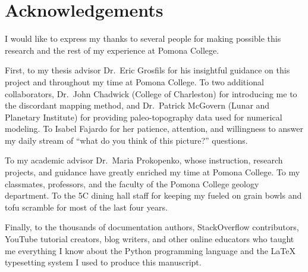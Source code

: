 \chapter*{Acknowledgements}

I would like to express my thanks to several people for making possible this research and the rest of my experience at Pomona College. 

First, to my thesis advisor Dr.\ Eric Grosfils for his insightful guidance on this project and throughout my time at Pomona College. To two additional collaborators, Dr.\ John Chadwick (College of Charleston) for introducing me to the discordant mapping method, and Dr.\ Patrick McGovern (Lunar and Planetary Institute) for providing paleo-topography data used for numerical modeling. To Isabel Fajardo for her patience, attention, and willingness to answer my daily stream of ``what do you think of this picture?'' questions.

To my academic advisor Dr.\ Maria Prokopenko, whose instruction, research projects, and guidance have greatly enriched my time at Pomona College. To my classmates, professors, and the faculty of the Pomona College geology department. To the 5C dining hall staff for keeping my fueled on grain bowls and tofu scramble for most of the last four years.

Finally, to the thousands of documentation authors, StackOverflow contributors, YouTube tutorial creators, blog writers, and other online educators who taught me everything I know about the Python programming language and the \LaTeX{} typesetting system I used to produce this manuscript.